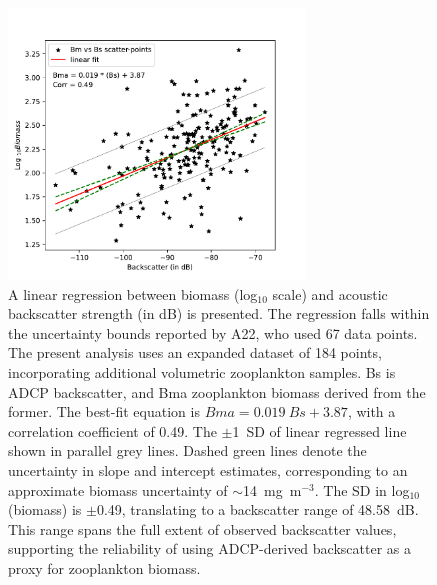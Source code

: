 \documentclass[authoryear,review,11pt]{elsarticle}
\begin{document}
\newpage
\begin{figure}[htbp]
	\centering
	\includegraphics[width=0.7\textwidth]{./fig_02_bstobm.pdf} 
	\captionsetup{justification=justified,font=footnotesize,skip=0.05\baselineskip,width=0.8\textwidth}
	\caption{A linear regression between biomass (log$_{10}$ scale) and acoustic backscatter strength (in dB) is presented. The regression falls within the uncertainty bounds reported by A22, who used 67 data points. The present analysis uses an expanded dataset of 184 points, incorporating additional volumetric zooplankton samples. Bs is ADCP backscatter, and Bma zooplankton biomass derived from the former. The best-fit equation is $Bma = 0.019~Bs + 3.87$, with a correlation coefficient of 0.49. The $\pm$1~SD of linear regressed line shown in parallel grey lines. Dashed green lines denote the uncertainty in slope and intercept estimates, corresponding to an approximate biomass uncertainty of $\sim$14~mg~m$^{-3}$. The SD in log$_{10}$(biomass) is $\pm$0.49, translating to a backscatter range of 48.58~dB. This range spans the full extent of observed backscatter values, supporting the reliability of using ADCP-derived backscatter as a proxy for zooplankton biomass.}
	\label{fig:bstobm}
\end{figure}

\newpage
\end{document}
